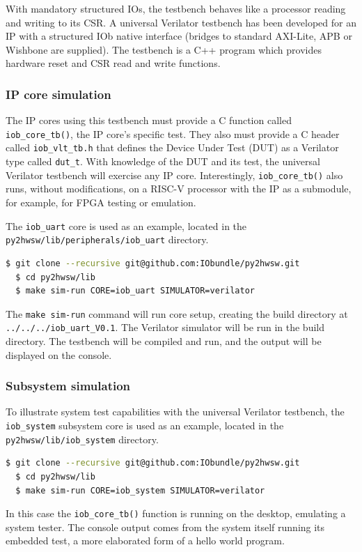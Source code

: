 %

With mandatory structured IOs, the testbench behaves like a processor reading
and writing to its CSR. A universal Verilator testbench has been developed for
an IP with a structured IOb native interface (bridges to standard AXI-Lite, APB
or Wishbone are supplied). The testbench is a C++ program which provides hardware
reset and CSR read and write functions.

\subsubsection{IP core simulation}

The IP cores using this testbench must provide a C function called
{\tt iob\_core\_tb()}, the IP core’s specific test. They also must provide a C header
called {\tt iob\_vlt\_tb.h} that defines the Device Under Test (DUT) as a Verilator
type called {\tt dut\_t}. With knowledge of the DUT and its test, the universal
Verilator testbench will exercise any IP core. Interestingly, {\tt iob\_core\_tb()} also
runs, without modifications, on a RISC-V processor with the IP as a submodule,
for example, for FPGA testing or emulation.

The {\tt iob\_uart} core is used as an example, located in the {\tt
  py2hwsw/lib/peripherals/iob\_uart} directory.

\begin{lstlisting}[language=bash]
  $ git clone --recursive git@github.com:IObundle/py2hwsw.git
  $ cd py2hwsw/lib
  $ make sim-run CORE=iob_uart SIMULATOR=verilator
\end{lstlisting}

The {\tt make sim-run} command will run core setup, creating the build directory
at {\tt ../../../iob\_uart\_V0.1}. The Verilator simulator will be run in the
build directory. The testbench will be compiled and run, and the output will be
displayed on the console.

\subsubsection{Subsystem simulation}

To illustrate system test capabilities with the universal Verilator testbench,
the {\tt iob\_system} subsystem core is used as an example, located in the {\tt
  py2hwsw/lib/iob\_system} directory.

\begin{lstlisting}[language=bash]
  $ git clone --recursive git@github.com:IObundle/py2hwsw.git
  $ cd py2hwsw/lib
  $ make sim-run CORE=iob_system SIMULATOR=verilator
\end{lstlisting}

In this case the {\tt iob\_core\_tb()} function is running on the desktop,
emulating a system tester. The console output comes from the system itself
running its embedded test, a more elaborated form of a hello world program.
